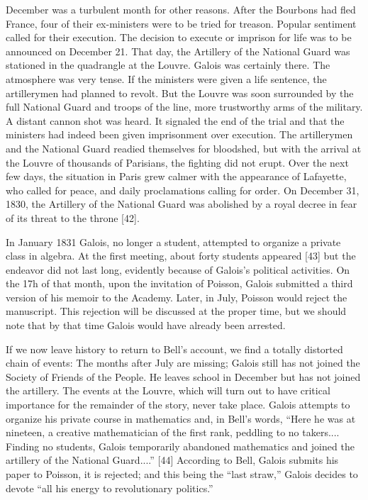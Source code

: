 \documentclass[12pt]{article}
\begin{document}
December was a turbulent month for other reasons. After the Bourbons had fled France, four of their ex-ministers were to be tried for treason. Popular sentiment called for their execution. The decision to execute or imprison for life was to be announced on December 21. That day, the Artillery of the National Guard was stationed in the quadrangle at the Louvre. Galois was certainly there. The atmosphere was very tense. If the ministers were given a life sentence, the artillerymen had planned to revolt. But the Louvre was soon surrounded by the full National Guard and troops of the line, more trustworthy arms of the military. A distant cannon shot was heard. It signaled the end of the trial and that the ministers had indeed been given imprisonment over execution. The artillerymen and the National Guard readied themselves for bloodshed, but with the arrival at the Louvre of thousands of Parisians, the fighting did not erupt. Over the next few days, the situation in Paris grew calmer with the appearance of Lafayette, who called for peace, and daily proclamations calling for order. On December 31, 1830, the Artillery of the National Guard was abolished by a royal decree in fear of its threat to the throne [42].

In January 1831 Galois, no longer a student, attempted to organize a private class in algebra. At the first meeting, about forty students appeared [43] but the endeavor did not last long, evidently because of Galois's political activities. On the 17h of that month, upon the invitation of Poisson, Galois submitted a third version of his memoir to the Academy. Later, in July, Poisson would reject the manuscript. This rejection will be discussed at the proper time, but we should note that by that time Galois would have already been arrested.

If we now leave history to return to Bell's account, we find a totally distorted chain of events: The months after July are missing; Galois still has not joined the Society of Friends of the People. He leaves school in December but has not joined the artillery. The events at the Louvre, which will turn out to have critical importance for the remainder of the story, never take place. Galois attempts to organize his private course in mathematics and, in Bell's words, ``Here he was at nineteen, a creative mathematician of the first rank, peddling to no takers.... Finding no students, Galois temporarily abandoned mathematics and joined the artillery of the National Guard....'' [44] According to Bell, Galois submits his paper to Poisson, it is rejected; and this being the ``last straw,'' Galois decides to devote ``all his energy to revolutionary politics.''
\end{document}
